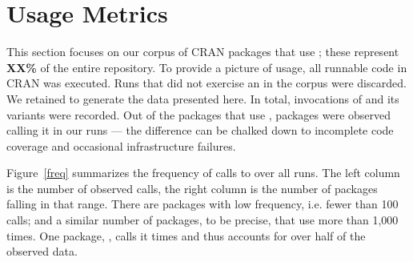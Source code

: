\documentclass[USenglish,cleveref, autoref, thm-restate]{lipics-v2019}
\begin{document}
\newpage
\section{Usage Metrics}

This section focuses on our corpus of \Corpus CRAN packages that use
\eval; these represent {\bf XX\%} of the entire repository. To provide
a picture of \eval usage, all runnable code in CRAN was executed. Runs
that did not exercise an \eval in the corpus were discarded. We
retained \Nbruns to generate the data presented here. In total,
\Allcalls invocations of \eval and its variants were recorded. Out of
the \Staticatleastonecallsite packages that use \eval, \Triggeredpkgs
packages were observed calling it in our runs --- the difference can
be chalked down to incomplete code coverage and occasional
infrastructure failures.


Figure~\ref{freq} summarizes the frequency of calls to \eval over all
runs. The left column is the number of observed calls, the right
column is the number of packages falling in that range. There are
\Fewcalls packages with low \eval frequency, i.e. fewer than 100
calls; and a similar number of packages, \Manycalls to be precise,
that use \eval more than 1,000 times. One package, \Maxcallspack,
calls it \Maxcalls times and thus accounts for over half of the
observed data.
\end{document}
